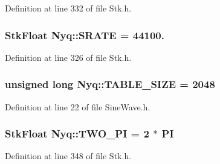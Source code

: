 Definition at line 332 of file Stk.\+h.

\subsubsection[{\texorpdfstring{S\+R\+A\+TE}{SRATE}}]{ {\bf Stk\+Float} Nyq\+::\+S\+R\+A\+TE = 44100.}\hypertarget{namespace_nyq_ab44c80bc2c6c5651f7994c235dc47a96}{}\label{namespace_nyq_ab44c80bc2c6c5651f7994c235dc47a96}


Definition at line 326 of file Stk.\+h.

\subsubsection[{\texorpdfstring{T\+A\+B\+L\+E\+\_\+\+S\+I\+ZE}{TABLE_SIZE}}]{ unsigned long Nyq\+::\+T\+A\+B\+L\+E\+\_\+\+S\+I\+ZE = 2048}\hypertarget{namespace_nyq_a67d17f86466f80afd7afb29516166ce3}{}\label{namespace_nyq_a67d17f86466f80afd7afb29516166ce3}


Definition at line 22 of file Sine\+Wave.\+h.

\subsubsection[{\texorpdfstring{T\+W\+O\+\_\+\+PI}{TWO_PI}}]{ {\bf Stk\+Float} Nyq\+::\+T\+W\+O\+\_\+\+PI = 2 $\ast$ {\bf PI}}\hypertarget{namespace_nyq_a90fefc442f0ed5cdf097908e99dd6eb2}{}\label{namespace_nyq_a90fefc442f0ed5cdf097908e99dd6eb2}


Definition at line 348 of file Stk.\+h.

